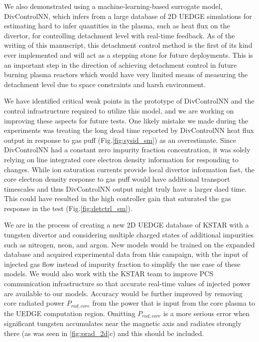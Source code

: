 We also demonstrated using a machine-learning-based surrogate model, DivControlNN, which infers from a large database of 2D UEDGE simulations for estimating hard to infer quantities in the plasma, such as heat flux on the divertor, for controlling detachment level with real-time feedback.
As of the writing of this manuscript, this detachment control method is the first of its kind ever implemented and will act as a stepping stone for future deployments.
This is an important step in the direction of achieving detachment control in future burning plasma reactors which would have very limited means of measuring the detachment level due to space constraints and harsh environment.

We have identified critical weak points in the prototype of DivControlNN and the control infrastructure required to utilize this model, and we are working on improving these aspects for future tests.
One likely mistake we made during the experiments was treating the long dead time reported by DivControlNN heat flux output in response to gas puff (Fig.\ref{fig:sysid_sm}) as an overestimate.
Since DivControlNN had a constant zero impurity fraction concentration, it was solely relying on line integrated core electron density information for responding to changes.
While ion saturation currents provide local divertor information fast, the core electron density response to gas puff would have additional transport timescales and thus DivControlNN output might truly have a larger daed time.
This could have resulted in the high controller gain that saturated the gas response in the test (Fig.\ref{fig:detctrl_sm}).

We are in the process of creating a new 2D UEDGE database of KSTAR with a tungsten divertor and considering multiple charged states of additional impurities such as nitrogen, neon, and argon.
New models would be trained on the expanded database and acquired experimental data from this campaign, with the input of injected gas flow instead of impurity fraction to simplify the use case of these models.
We would also work with the KSTAR team to improve PCS communication infrastructure so that accurate real-time values of injected power are available to our models.
Accuracy would be further improved by removing core radiated power $P_{rad,core}$ from the power that is input from the core plasma to the UEDGE computation region.
Omitting $P_{rad,core}$ is a more serious error when significant tungsten accumulates near the magnetic axis and radiates strongly there (as was seen in \ref{fig:prad_2d}c) and this should be included.


